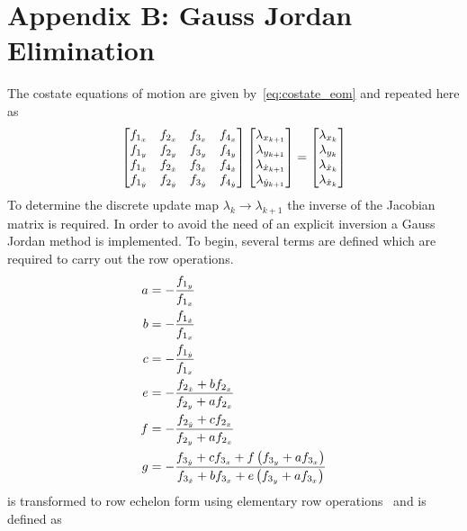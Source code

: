 \documentclass[letterpaper, preprint, paper,11pt]{AAS}	%
\begin{document}
\section*{Appendix B: Gauss Jordan Elimination}\label{sec:costate_gauss_jordan}
The costate equations of motion are given by~\cref{eq:costate_eom} and repeated here as
\begin{align}\label{eq:costate_eom_transpose}
	\begin{bmatrix} 
		\fonex & \ftwox & \fthreex & \ffourx \\
		\foney & \ftwoy & \fthreey & \ffoury \\
		\fonexd & \ftwoxd & \fthreexd & \ffourxd \\
		\foneyd & \ftwoyd & \fthreeyd & \ffouryd
	\end{bmatrix}
	\begin{bmatrix} \lambda_{\xkp} \\ \lambda_{\ykp} \\ \lambda_{\xdotkp} \\ \lambda_{\ydotkp} \end{bmatrix}
	=
	\begin{bmatrix} \lambda_{\xk} \\ \lambda_{\yk} \\ \lambda_{\xdotk} \\ \lambda_{\ydotk} \end{bmatrix}
\end{align}
To determine the discrete update map \( \lambda_k \to \lambda_{k+1}\) the inverse of the Jacobian matrix is required.
In order to avoid the need of an explicit inversion a Gauss Jordan method is implemented.
To begin, several terms are defined which are required to carry out the row operations.
\begin{subequations}\label{eq:ref_scale}
\begin{align}
	a &= -\frac{f_{1_y}}{f_{1_x}} \\
	b &= -\frac{f_{1_{\dot x}}}{f_{1_x}} \\
	c &= -\frac{f_{1_{\dot y}}}{f_{1_x}} \\
	e &= -\frac{f_{2_{\dot x}} + b f_{2_x}}{f_{2_y} + a f_{2_x}} \\
	f &= -\frac{f_{2_{\dot y}} + c f_{2_x}}{f_{2_y} + a f_{2_x}} \\
	g &= -\frac{f_{3_{\dot y}} + c f_{3_x} + f \left( f_{3_y} + a f_{3_x} \right)}{f_{3_{\dot x}} + b f_{3_x} + e \left( f_{3_y} + a f_{3_x} \right)}
\end{align}
\end{subequations}
 is transformed to row echelon form using elementary row operations~\cite{strang2008} and is defined as
\end{document}
